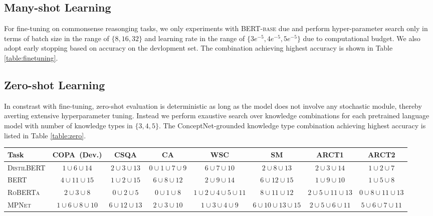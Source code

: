 \documentclass[11pt]{article}
\newcommand{\tabref}[1]{Table \ref{#1}}
\begin{document}
\subsection{Many-shot Learning}
For fine-tuning on commonsense reasonging tasks, we only experiments with \textsc{BERT-base} due and perform hyper-parameter search only in terms of batch size in the range of $\{8, 16, 32\}$ and learning rate in the range of $\{3e^{-5}, 4e^{-5}, 5e^{-5}\}$ due to computational budget. We also adopt early stopping based on accuracy on the devlopment set. The combination achieving highest accuracy is shown in \tabref{table:finetuning}.

\subsection{Zero-shot Learning}
In constrast with fine-tuning, zero-shot evaluation is deterministic as long as the model does not involve any stochastic module, thereby averting extensive hyperparameter tuning.
Instead we perform exaustive search over knowledge combinations for each pretrained language model with number of knowledge types in $\{3,4,5\}$. The ConceptNet-grounded knowledge type combination achieving highest accuracy is listed in Table \ref{table:zero}.
\begin{table*}[tb!]
	\centering
	\scriptsize
	\begin{tabular}{l|ccccccc}
		\toprule
		\textbf{Task} &\textbf{COPA~(Dev.)} &\textbf{CSQA} &\textbf{CA} &\textbf{WSC} &\textbf{SM} &\textbf{ARCT1} &\textbf{ARCT2}\\
		\midrule
		\textsc{DistilBERT}  &$1\cup 6\cup 14$ &$2\cup 3\cup 13$ &$0\cup 1\cup 7\cup 9$  &$6\cup 7\cup 10$ &$2\cup 8\cup 13$ &$2\cup 3\cup 14$ &$1\cup 2\cup 7$\\
		\textsc{BERT}  &$4\cup 11\cup 15$ &$1\cup 2\cup 15$ &$6\cup 8\cup 12$  &$2\cup 9\cup 14$ &$6\cup 12\cup 15$ &$1\cup 9\cup 10$ &$1\cup 5\cup 8$\\
		\textsc{RoBERTa} &$2\cup 3\cup 8$  & $0\cup 2\cup 5$&$0\cup 1\cup 8$  &$1\cup 2\cup 4\cup 5\cup 11$ &$8\cup 11\cup 12$ &$2\cup 5\cup 11\cup 13$&$0\cup 8\cup 11\cup 13$\\
		\textsc{MPNet}  &$1\cup 6\cup 8\cup 10$ &$6\cup 12\cup 13$ &$2\cup 3\cup 10$  &$1\cup 3\cup 4\cup 9$ &$6\cup 10\cup 13\cup 15$ &$2\cup 5\cup 6\cup 11$ &$5\cup 6\cup 7\cup 11$ \\
		\bottomrule
	\end{tabular}
	\caption{Optimal zero-shot knowledge type combination for each PLM on each commonsense reasoning tasks.}
	\label{table:zero}
\end{table*}
\end{document}
